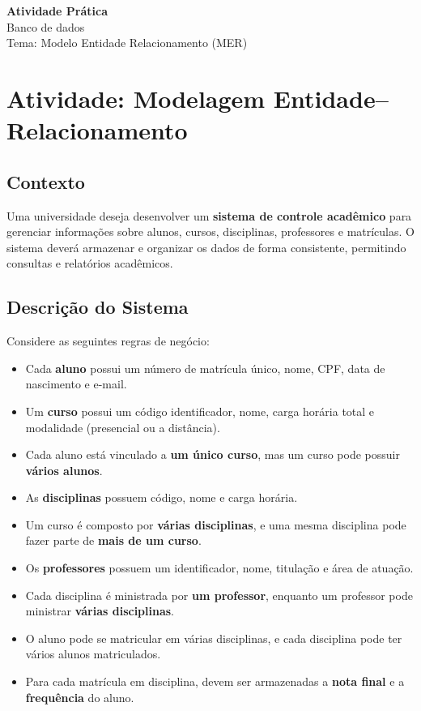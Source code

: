 \documentclass[12pt]{article}
\begin{document}
    
    \vspace*{0.2cm}
    \begin{center}
      {\Large \textbf{Atividade Prática}}\\[0.2cm]
      {\large Banco de dados}\\[0.2cm]
      Tema: Modelo Entidade Relacionamento (MER)
    \end{center}
    
    \vspace{0.5cm}
    
\section*{Atividade: Modelagem Entidade--Relacionamento}

\subsection*{Contexto}

Uma universidade deseja desenvolver um \textbf{sistema de controle acadêmico} para gerenciar informações sobre alunos, cursos, disciplinas, professores e matrículas. O sistema deverá armazenar e organizar os dados de forma consistente, permitindo consultas e relatórios acadêmicos.

\subsection*{Descrição do Sistema}

Considere as seguintes regras de negócio:

\begin{itemize}
  \item Cada \textbf{aluno} possui um número de matrícula único, nome, CPF, data de nascimento e e-mail.
  \item Um \textbf{curso} possui um código identificador, nome, carga horária total e modalidade (presencial ou a distância).
  \item Cada aluno está vinculado a \textbf{um único curso}, mas um curso pode possuir \textbf{vários alunos}.
  \item As \textbf{disciplinas} possuem código, nome e carga horária.
  \item Um curso é composto por \textbf{várias disciplinas}, e uma mesma disciplina pode fazer parte de \textbf{mais de um curso}.
  \item Os \textbf{professores} possuem um identificador, nome, titulação e área de atuação.
  \item Cada disciplina é ministrada por \textbf{um professor}, enquanto um professor pode ministrar \textbf{várias disciplinas}.
  \item O aluno pode se matricular em várias disciplinas, e cada disciplina pode ter vários alunos matriculados.
  \item Para cada matrícula em disciplina, devem ser armazenadas a \textbf{nota final} e a \textbf{frequência} do aluno.
\end{itemize}
\end{document}
